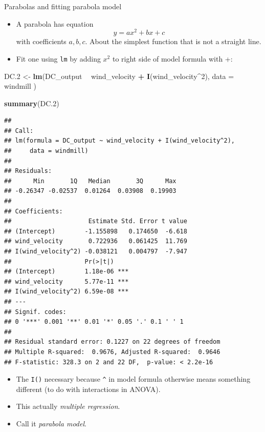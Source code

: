 \documentclass[
  ignorenonframetext,
]{beamer}
\newenvironment{Shaded}{\begin{snugshade}}{\end{snugshade}}
\newcommand{\DataTypeTok}[1]{\textcolor[rgb]{0.13,0.29,0.53}{#1}}
\newcommand{\DecValTok}[1]{\textcolor[rgb]{0.00,0.00,0.81}{#1}}
\newcommand{\FloatTok}[1]{\textcolor[rgb]{0.00,0.00,0.81}{#1}}
\newcommand{\KeywordTok}[1]{\textcolor[rgb]{0.13,0.29,0.53}{\textbf{#1}}}
\newcommand{\NormalTok}[1]{#1}
\newcommand{\OperatorTok}[1]{\textcolor[rgb]{0.81,0.36,0.00}{\textbf{#1}}}
\newcommand{\StringTok}[1]{\textcolor[rgb]{0.31,0.60,0.02}{#1}}
\providecommand{\tightlist}{%
  \setlength{\itemsep}{0pt}\setlength{\parskip}{0pt}}
\begin{document}
\begin{frame}[fragile]{Parabolas and fitting parabola model}
\protect\hypertarget{parabolas-and-fitting-parabola-model}{}

\begin{itemize}
\tightlist
\item
  A parabola has equation \[y = ax^2 + bx + c\] with coefficients
  \(a, b, c\). About the simplest function that is not a straight line.
\item
  Fit one using \texttt{lm} by adding \(x^2\) to right side of model
  formula with +:
\end{itemize}

\begin{Shaded}
\begin{Highlighting}[]
\NormalTok{DC}\FloatTok{.2}\NormalTok{ <-}\StringTok{ }\KeywordTok{lm}\NormalTok{(DC_output }\OperatorTok{~}\StringTok{ }\NormalTok{wind_velocity }\OperatorTok{+}\StringTok{ }\KeywordTok{I}\NormalTok{(wind_velocity}\OperatorTok{^}\DecValTok{2}\NormalTok{),}
  \DataTypeTok{data =}\NormalTok{ windmill}
\NormalTok{)}
\end{Highlighting}
\end{Shaded}

\begin{Shaded}
\begin{Highlighting}[]
\KeywordTok{summary}\NormalTok{(DC}\FloatTok{.2}\NormalTok{)}
\end{Highlighting}
\end{Shaded}

\begin{verbatim}
## 
## Call:
## lm(formula = DC_output ~ wind_velocity + I(wind_velocity^2), 
##     data = windmill)
## 
## Residuals:
##      Min       1Q   Median       3Q      Max 
## -0.26347 -0.02537  0.01264  0.03908  0.19903 
## 
## Coefficients:
##                     Estimate Std. Error t value
## (Intercept)        -1.155898   0.174650  -6.618
## wind_velocity       0.722936   0.061425  11.769
## I(wind_velocity^2) -0.038121   0.004797  -7.947
##                    Pr(>|t|)    
## (Intercept)        1.18e-06 ***
## wind_velocity      5.77e-11 ***
## I(wind_velocity^2) 6.59e-08 ***
## ---
## Signif. codes:  
## 0 '***' 0.001 '**' 0.01 '*' 0.05 '.' 0.1 ' ' 1
## 
## Residual standard error: 0.1227 on 22 degrees of freedom
## Multiple R-squared:  0.9676, Adjusted R-squared:  0.9646 
## F-statistic: 328.3 on 2 and 22 DF,  p-value: < 2.2e-16
\end{verbatim}

\begin{itemize}
\tightlist
\item
  The \texttt{I()} necessary because \texttt{\^{}} in model formula
  otherwise means something different (to do with interactions in
  ANOVA).
\item
  This actually \emph{multiple regression}.
\item
  Call it \emph{parabola model}.
\end{itemize}

\end{frame}
\end{document}
